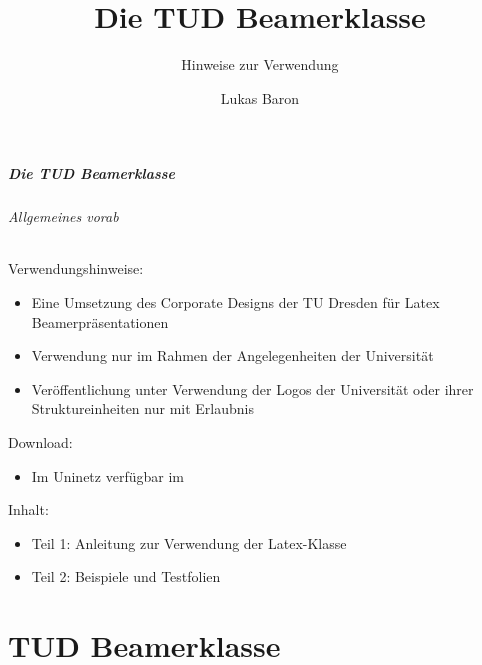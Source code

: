 \documentclass[german,notoc]{tudbeamer}%
\title[TUD Beamer]{Die TUD Beamerklasse}
\subtitle{Hinweise zur Verwendung}
\author{Lukas Baron}
\institute[ET-IT \textbullet{} IfA]{Fakultät Elektrotechnik und Informationstechnik \textbullet{} Institut für Automatisierungstechnik}
\begin{document}
% 
% 
 
\maketitle

% 
%
\disableFrameTitleSectionNum
\begin{frame}
	\frametitle{Die TUD Beamerklasse}
	\framesubtitle{Allgemeines vorab}

	Verwendungshinweise:
	\begin{itemize}
		\item Eine Umsetzung des Corporate Designs der TU Dresden für Latex Beamerpräsentationen
		\item Verwendung nur im Rahmen der Angelegenheiten der Universität
		\item Veröffentlichung unter Verwendung der Logos der Universität oder ihrer Struktureinheiten nur mit Erlaubnis
	\end{itemize}
	Download:
	\begin{itemize}
		\item Im Uninetz verfügbar im \href{%
				https://git.agtele.eats.et.tu-dresden.de/agtele-public/latex/de.tud.et.ifa.latex.ifaslides%
			}{%
			}
	\end{itemize}
	Inhalt:
	\begin{itemize}
		\item Teil 1: Anleitung zur Verwendung der Latex-Klasse 
		\item Teil 2: Beispiele und Testfolien
	\end{itemize}
\end{frame}
\enableFrameTitleSectionNum


\part{TUD Beamerklasse}
\end{document}

